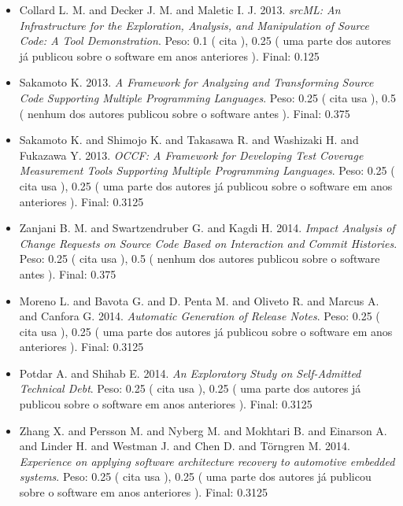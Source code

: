 \begin{itemize}
\item Collard L. M. and Decker J. M. and Maletic I. J.
      2013.
        \textit{ srcML: An Infrastructure for the Exploration, Analysis, and Manipulation of Source Code: A Tool Demonstration}.
      Peso:
      0.1 (
          cita
      ),
      0.25 (
uma parte dos autores já publicou sobre o software em anos anteriores
      ).
      Final:
      0.125

\item Sakamoto K.
      2013.
        \textit{ A Framework for Analyzing and Transforming Source Code Supporting Multiple Programming Languages}.
      Peso:
      0.25 (
          cita
          usa
      ),
      0.5 (
nenhum dos autores publicou sobre o software antes
      ).
      Final:
      0.375

\item Sakamoto K. and Shimojo K. and Takasawa R. and Washizaki H. and Fukazawa Y.
      2013.
        \textit{ OCCF: A Framework for Developing Test Coverage Measurement Tools Supporting Multiple Programming Languages}.
      Peso:
      0.25 (
          cita
          usa
      ),
      0.25 (
uma parte dos autores já publicou sobre o software em anos anteriores
      ).
      Final:
      0.3125

\item Zanjani B. M. and Swartzendruber G. and Kagdi H.
      2014.
        \textit{ Impact Analysis of Change Requests on Source Code Based on Interaction and Commit Histories}.
      Peso:
      0.25 (
          cita
          usa
      ),
      0.5 (
nenhum dos autores publicou sobre o software antes
      ).
      Final:
      0.375

\item Moreno L. and Bavota G. and D. Penta M. and Oliveto R. and Marcus A. and Canfora G.
      2014.
        \textit{ Automatic Generation of Release Notes}.
      Peso:
      0.25 (
          cita
          usa
      ),
      0.25 (
uma parte dos autores já publicou sobre o software em anos anteriores
      ).
      Final:
      0.3125

\item Potdar A. and Shihab E.
      2014.
        \textit{ An Exploratory Study on Self-Admitted Technical Debt}.
      Peso:
      0.25 (
          cita
          usa
      ),
      0.25 (
uma parte dos autores já publicou sobre o software em anos anteriores
      ).
      Final:
      0.3125

\item Zhang X. and Persson M. and Nyberg M. and Mokhtari B. and Einarson A. and Linder H. and Westman J. and Chen D. and Törngren M.
      2014.
        \textit{ Experience on applying software architecture recovery to automotive embedded systems}.
      Peso:
      0.25 (
          cita
          usa
      ),
      0.25 (
uma parte dos autores já publicou sobre o software em anos anteriores
      ).
      Final:
      0.3125


\end{itemize}
